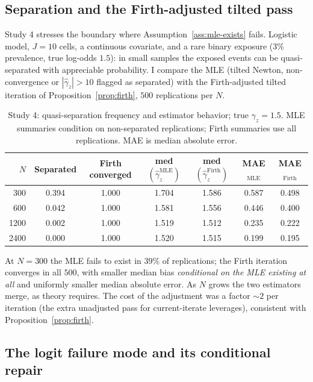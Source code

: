 \documentclass[11pt]{article}
\begin{document}
\subsection{Separation and the Firth-adjusted tilted pass}
\label{sec:sim-separation}

Study 4 stresses the boundary where Assumption~\ref{ass:mle-exists}
fails.  Logistic model, $J = 10$ cells, a continuous covariate, and a
rare binary exposure ($3\%$ prevalence, true log-odds $1.5$): in small
samples the exposed events can be quasi-separated with appreciable
probability.  I compare the MLE (tilted Newton, non-convergence or
$|\hat\gamma_z| > 10$ flagged as separated) with the Firth-adjusted
tilted iteration of Proposition~\ref{prop:firth}, $500$ replications per
$N$.

\begin{table}[t]
\centering
\caption{Study 4: quasi-separation frequency and estimator behavior;
true $\gamma_z = 1.5$.  MLE summaries condition on non-separated
replications; Firth summaries use all replications.  MAE is median
absolute error.}
\label{tab:sim4}
\small
\begin{tabular}{rcccccc}
\toprule
$N$ & Separated & Firth converged & med$(\hat\gamma_z^{\mathrm{MLE}})$ &
med$(\hat\gamma_z^{\mathrm{Firth}})$ & MAE$_{\mathrm{MLE}}$ &
MAE$_{\mathrm{Firth}}$ \\
\midrule
300  & 0.394 & 1.000 & 1.704 & 1.586 & 0.587 & 0.498 \\
600  & 0.042 & 1.000 & 1.581 & 1.556 & 0.446 & 0.400 \\
1200 & 0.002 & 1.000 & 1.519 & 1.512 & 0.235 & 0.222 \\
2400 & 0.000 & 1.000 & 1.520 & 1.515 & 0.199 & 0.195 \\
\bottomrule
\end{tabular}
\end{table}

At $N = 300$ the MLE fails to exist in $39\%$ of replications; the Firth
iteration converges in all $500$, with smaller median bias
\emph{conditional on the MLE existing at all} and uniformly smaller
median absolute error.  As $N$ grows the two estimators merge, as theory
requires.  The cost of the adjustment was a factor $\sim\!2$ per
iteration (the extra unadjusted pass for current-iterate leverages),
consistent with Proposition~\ref{prop:firth}.

\subsection{The logit failure mode and its conditional repair}
\label{sec:sim-logit}
\end{document}
